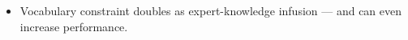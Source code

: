 \begin{itemize}
    \item Vocabulary constraint doubles as expert-knowledge infusion — and can even increase performance. 

\end{itemize}

